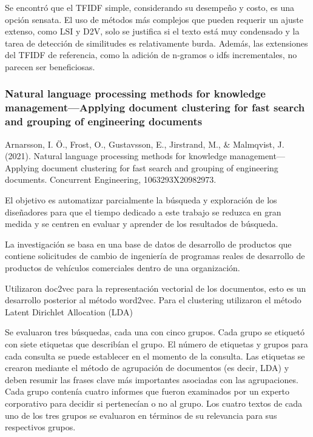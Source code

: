 \documentclass[12pt]{article}
\begin{document}
			Se encontró que el TFIDF simple, considerando su desempeño y costo, es una opción sensata. El uso de métodos más complejos que pueden requerir un ajuste extenso, como LSI y D2V, solo se justifica si el texto está muy condensado y la tarea de detección de similitudes es relativamente burda. Además, las extensiones del TFIDF de referencia, como la adición de n-gramos o idfs incrementales, no parecen ser beneficiosas.			
			
			\subsubsection{Natural language processing methods for knowledge management—Applying document clustering for fast search and grouping of engineering documents}
			Arnarsson, I. Ö., Frost, O., Gustavsson, E., Jirstrand, M., \& Malmqvist, J. (2021). Natural language processing methods for knowledge management—Applying document clustering for fast search and grouping of engineering documents. Concurrent Engineering, 1063293X20982973.
			
			El objetivo es automatizar parcialmente la búsqueda y exploración de los diseñadores para que el tiempo dedicado a este trabajo se reduzca en gran medida y se centren en evaluar y aprender de los resultados de búsqueda.
			
			La investigación se basa en una base de datos de desarrollo de productos que contiene solicitudes de cambio de ingeniería de programas reales de desarrollo de productos de vehículos comerciales dentro de una organización.
			
			Utilizaron doc2vec para la representación vectorial de los documentos, esto es un desarrollo posterior al método word2vec.
			Para el clustering utilizaron el método Latent Dirichlet Allocation (LDA)
			
			Se evaluaron tres búsquedas, cada una con cinco grupos. Cada grupo se etiquetó con siete etiquetas que describían el grupo. El número de etiquetas y grupos para cada consulta se puede establecer en el momento de la consulta. Las etiquetas se crearon mediante el método de agrupación de documentos (es decir, LDA) y deben resumir las frases clave más importantes asociadas con las agrupaciones.
			Cada grupo contenía cuatro informes que fueron examinados por un experto corporativo para decidir si pertenecían o no al grupo. Los cuatro textos de cada uno de los tres grupos se evaluaron en términos de su relevancia para sus respectivos grupos.
			
\end{document}
